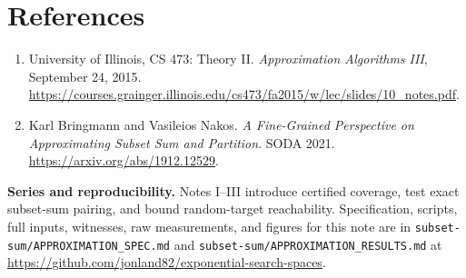 \documentclass[10pt,english]{article}
\begin{document}
\section{References}
\begin{enumerate}
\item University of Illinois, CS 473: Theory II. \emph{Approximation Algorithms III}, September 24, 2015. \url{https://courses.grainger.illinois.edu/cs473/fa2015/w/lec/slides/10_notes.pdf}.
\item Karl Bringmann and Vasileios Nakos. \emph{A Fine-Grained Perspective on Approximating Subset Sum and Partition}. SODA 2021. \url{https://arxiv.org/abs/1912.12529}.
\end{enumerate}

\noindent\textbf{Series and reproducibility.} Notes I--III introduce certified coverage, test exact subset-sum pairing, and bound random-target reachability. Specification, scripts, full inputs, witnesses, raw measurements, and figures for this note are in \texttt{subset-sum/APPROXIMATION\_SPEC.md} and \texttt{subset-sum/APPROXIMATION\_RESULTS.md} at \url{https://github.com/jonland82/exponential-search-spaces}.
\end{document}
